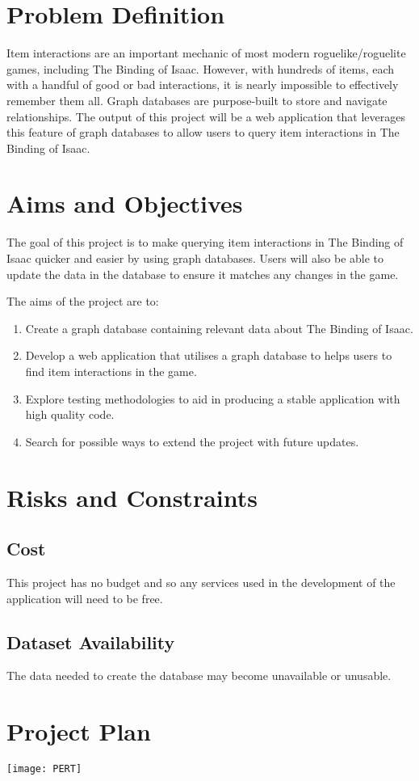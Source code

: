 \section{Problem Definition}
Item interactions are an important mechanic of most modern roguelike/roguelite games, including The Binding of Isaac. 
However, with hundreds of items, each with a handful of good or bad interactions, it is nearly impossible to effectively
 remember them all. Graph databases are purpose-built to store and navigate relationships.\cite{WhatGraphDatabase} 
The output of this project will be a web application that leverages this feature of graph databases to allow users to query item 
interactions in The Binding of Isaac.
\section{Aims and Objectives}
The goal of this project is to make querying item interactions in The Binding of Isaac quicker and easier by using graph
 databases. Users will also be able to update the data in the database to ensure it matches any changes in the game.\par
The aims of the project are to:
\begin{enumerate}
    \item Create a graph database containing relevant data about The Binding of Isaac.
    \item Develop a web application that utilises a graph database to helps users to find item interactions in the game.
    \item Explore testing methodologies to aid in producing a stable application with high quality code.
    \item Search for possible ways to extend the project with future updates.
\end{enumerate}
\section{Risks and Constraints}
\subsection*{Cost}
This project has no budget and so any services used in the development of the application will need to be free.
\subsection*{Dataset Availability}
The data needed to create the database may become unavailable or unusable.
\section{Project Plan}
\texttt{[image: PERT]}